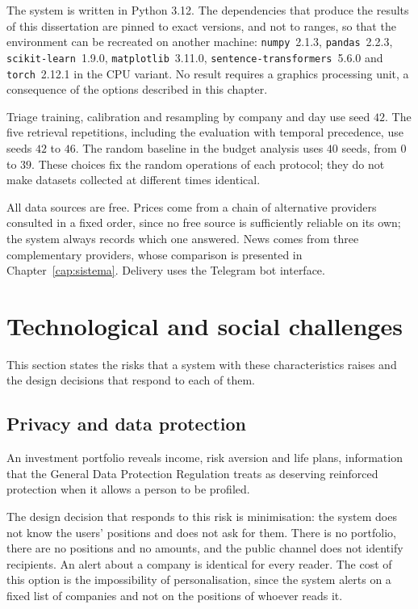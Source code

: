 The system is written in Python 3.12. The dependencies that produce the results of this
dissertation are pinned to exact versions, and not to ranges, so that the environment can be
recreated on another machine: \texttt{numpy}~2.1.3, \texttt{pandas}~2.2.3,
\texttt{scikit-learn}~1.9.0, \texttt{matplotlib}~3.11.0, \texttt{sentence-transformers}~5.6.0 and
\texttt{torch}~2.12.1 in the CPU variant. No result requires a graphics processing unit, a
consequence of the options described in this chapter.

Triage training, calibration and resampling by company and day use seed $42$.
The five retrieval repetitions, including the evaluation with temporal precedence, use seeds
$42$ to $46$. The random baseline in the budget analysis uses $40$ seeds, from $0$ to $39$.
These choices fix the random operations of each protocol; they do not make datasets collected
at different times identical.

All data sources are free. Prices come from a chain of alternative providers consulted in a fixed
order, since no free source is sufficiently reliable on its own; the system always records which
one answered. News comes from three complementary providers, whose comparison is presented in
Chapter~\ref{cap:sistema}. Delivery uses the Telegram bot interface.

\section{Technological and social challenges}
\label{sec:met_desafios}

This section states the risks that a system with these characteristics raises and the design
decisions that respond to each of them.

\subsection{Privacy and data protection}
\label{sec:met_privacidade}

An investment portfolio reveals income, risk aversion and life plans, information that the General
Data Protection Regulation treats as deserving reinforced protection when it allows a person to be
profiled.

The design decision that responds to this risk is minimisation: the system does not know the
users' positions and does not ask for them. There is no portfolio, there are no positions and no
amounts, and the public channel does not identify recipients. An alert about a company is identical
for every reader. The cost of this option is the impossibility of personalisation, since the system
alerts on a fixed list of companies and not on the positions of whoever reads it.

